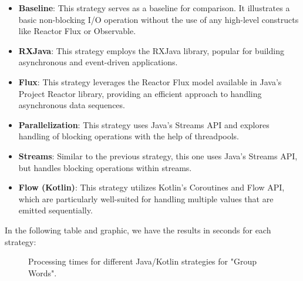     \begin{itemize}
        \item \textbf{Baseline}: This strategy serves as a baseline for comparison. It illustrates a basic non-blocking I/O operation without the use of any high-level constructs like Reactor Flux or Observable.
        \item \textbf{RXJava}: This strategy employs the RXJava library, popular for building asynchronous and event-driven applications.
        \item \textbf{Flux}: This strategy leverages the Reactor Flux model available in Java's Project Reactor library, providing an efficient approach to handling asynchronous data sequences.
        \item \textbf{Parallelization}: This strategy uses Java's Streams API and explores handling of blocking operations with the help of threadpools.
        \item \textbf{Streams}: Similar to the previous strategy, this one uses Java's Streams API, but handles blocking operations within streams.
        \item \textbf{Flow (Kotlin)}: This strategy utilizes Kotlin's Coroutines and Flow API, which are particularly well-suited for handling multiple values that are emitted sequentially.
    \end{itemize}

    In the following table and graphic, we have the results in seconds for each strategy:

    \begin{figure}[H]
        \centering
        \caption{Processing times for different Java/Kotlin strategies for "Group Words".}
        \label{fig:processing_times}
    \end{figure}
    

